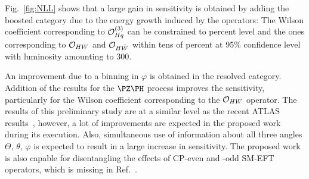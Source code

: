 \documentclass[a4paper,11pt]{article}
\begin{document}
Fig.~\ref{fig:NLL} shows that a large gain in sensitivity is obtained by adding the boosted category due to the energy growth induced by the operators:
The Wilson coefficient corresponding to ${\cal O}^{(3)}_{Hq}$ can be constrained to percent level and the ones corresponding to ${\cal O}_{HW}$ and ${\cal O}_{H\tilde{W}}$ within tens of percent at 95\% confidence level with luminosity amounting to 300\fbinv. 

An improvement due to a binning in $\varphi$ is obtained in the resolved category. 
Addition of the results for the $\PZ\PH$ process improves the sensitivity, particularly for the Wilson coefficient corresponding to the ${\cal O}_{HW}$ operator.
The results of this preliminary study are at a similar level as the recent ATLAS results~\cite{ATLAS-CONF-2021-051},
however, a lot of improvements are expected in the proposed work during its execution.
Also, simultaneous use of information about all three angles $\Theta$, $\theta$, $\varphi$ is expected to result in a large increase in sensitivity.
The proposed work is also capable for disentangling the effects of CP-even and -odd SM-EFT operators, which is missing in Ref.~\cite{ATLAS-CONF-2021-051}. 
\end{document}
